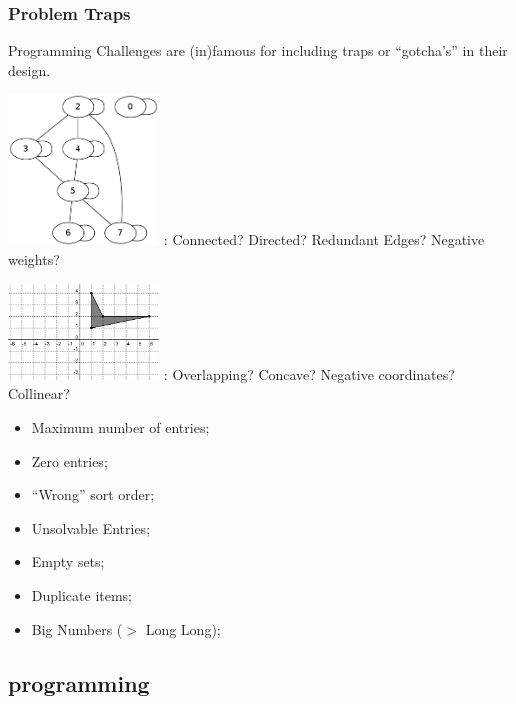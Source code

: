 \documentclass{beamer}
\begin{document}



\begin{frame}
  \frametitle{Problem Traps}
  Programming Challenges are (in)famous for including traps or
  ``gotcha's'' in their design.

  \includegraphics[width=0.3\textwidth]{img/graph1}    
  : Connected? Directed? Redundant Edges? Negative weights?

  \includegraphics[width=0.3\textwidth]{img/polygon} 
  : Overlapping? Concave? Negative coordinates? Collinear?

  \begin{itemize}
  \item Maximum number of entries;
  \item Zero entries;
  \item ``Wrong'' sort order;
  \item Unsolvable Entries;
  \item Empty sets;
  \item Duplicate items;
  \item Big Numbers ($>$ Long Long);
  \end{itemize}

\end{frame}

\subsection{programming}
\end{document}
